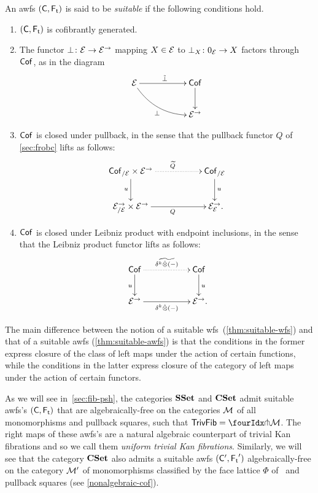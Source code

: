 \documentclass[reqno,10pt,a4paper,oneside,draft]{amsart}
\begin{document}
{{\begin{definition} \label{thm:suitable-awfs}
An awfs $(\CC, \TF)$ is said to be \emph{suitable} if the following conditions hold.
\begin{enumerate}[({S}1)]
\item $(\CC, \TF)$ is cofibrantly generated.
\item The functor $\bot \co \cal{E} \to \cal{E}^\to$ mapping $X \in \cal{E}$ to $\bot_X \co 0_{\cal{E}} \to X$ factors through $\Cof$, as in the diagram
\[
\xymatrix@C+3em{
\catE \ar[r]^{\tilde{\bot}} \ar@/_1pc/[dr]_{\bot} & \Cof \ar[d] \\
  & \catE^\to}
\]
\item $\Cof$ is closed under pullback, in the sense that the pullback functor $Q$ of \cref{sec:frobc} lifts as follows:
\[
\xymatrix@C+3em{
  \Cof_{/\cal{E}} \times \cal{E}^\to
  \ar@{.>}[r]^{\widetilde{Q}}
  \ar[d]_{u}
&
  \Cof_{/\cal{E}}
  \ar[d]^{u}
\\
  \catE^\to_{/\cal{E}} \times \calE^\to
  \ar[r]_{Q}
&
  \catE^\to_{\cal{E}}
\rlap{.}}
\]
\item $\Cof$ is closed under Leibniz product with endpoint inclusions, in the sense that the Leibniz product functor lifts as follows:
\[
\xymatrix@C+3em{
  \Cof
  \ar@{.>}[r]^{\widetilde{\kcyl \hatotimes (-)}}
  \ar[d]_{u}
&
 \Cof
  \ar[d]^{u}
\\
  \catE^\to
  \ar[r]_{\kcyl \hatotimes (-)}
&
  \catE^\to
\rlap{.}}
\]
\end{enumerate}
\end{definition}

The main difference between the notion of a suitable wfs~(\cref{thm:suitable-wfs}) and that of a suitable awfs (\cref{thm:suitable-awfs}) is that the conditions in the former express closure of the class of left maps under the action of certain functions, while the conditions in the latter express closure of the category of left maps under the action of certain functors.

\begin{example} \label{unif-triv-fib-sset}
As we will see in~\cref{sec:fib-psh}, the categories $\SSet$ and $\CSet$ admit suitable awfs's $(\CC, \TF)$ that are algebraically-free on the categories $\cal{M}$ of all monomorphisms and pullback squares, \ie such that $\TrivFib = \liftr{\cal{M}}$.
The right maps of these awfs's are a natural algebraic counterpart of trivial Kan fibrations and so we call them \emph{uniform trivial Kan fibrations}.
Similarly, we will see that the category $\CSet$ also admits a suitable awfs $(\CC', \TF')$ algebraically-free on the category $\cal{M}'$ of monomorphisms classified by the face lattice $\Phi$ of~\cite{cohen-et-al:cubicaltt} and pullback squares (see \cref{nonalgebraic-cof}).
\end{example}

}}
\end{document}
